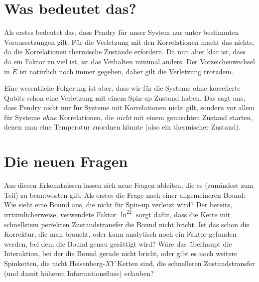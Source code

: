 \documentclass[a4paper,11pt]{scrartcl}
\begin{document}
\section*{Was bedeutet das?}
Als erstes bedeutet das, dass Pendry für unser System nur unter bestimmten
Voraussetzungen gilt. Für die Verletzung mit den Korrelationen macht das nichts,
da die Korrelationen thermische Zustände erfordern. Da nun aber klar ist, dass da
ein Faktor zu viel ist, ist das Verhalten minimal anders. Der Vorzeichenwechsel
in $\dot{E}$ ist natürlich noch immer gegeben, daher gilt die Verletzung trotzdem.

Eine wesentliche Folgerung ist aber, dass wir für die Systeme ohne korrelierte
Qubits schon eine Verletzung mit einem Spin-up Zustand haben. Das sagt uns, dass
Pendry nicht nur für Systeme mit Korrelationen nicht gilt, sondern vor allem für
Systeme \emph{ohne} Korrelationen, die \emph{nicht} mit einem gemischten Zustand
starten, denen man eine Temperatur zuordnen könnte (also ein thermischer Zustand).
\section*{Die neuen Fragen}
Aus diesen Erkenntnissen lassen sich neue Fragen ableiten, die es (zumindest zum
Teil) zu beantworten gilt. Als erstes die Frage nach einer allgemeineren Bound:
Wie sieht eine Bound aus, die nicht für Spin-up verletzt wird? Der bereits,
irrtümlicherweise, verwendete Faktor $\ln^22$ sorgt dafür, dass die Kette mit
schnellstem perfekten Zustandstransfer die Bound nicht bricht. Ist das schon die
Korrektur, die man braucht, oder kann analytisch noch ein Faktor gefunden werden,
bei dem die Bound genau gesättigt wird? Wäre das überhaupt die Interaktion, bei
der die Bound gerade nicht bricht, oder gibt es noch weitere Spinketten, die nicht
Heisenberg-$XY$ Ketten sind, die schnelleren Zustandstransfer (und damit höheren
Informationsfluss) erlauben?

\printbibliography
\end{document}
